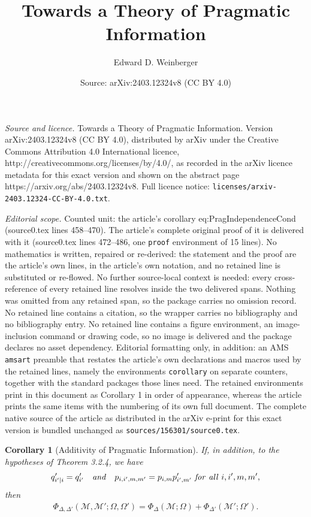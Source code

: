 \documentclass[10pt,a4paper]{amsart}
\title{Towards a Theory of Pragmatic Information}
\author{Edward D. Weinberger}
\date{Source: arXiv:2403.12324v8 (CC BY 4.0)}
\newtheorem{corollary}{Corollary}
\begin{document}
\maketitle

\noindent\emph{Source and licence.} Towards a Theory of Pragmatic Information. Version arXiv:2403.12324v8 (CC BY 4.0), distributed by arXiv under the Creative Commons Attribution 4.0 International licence, http://creativecommons.org/licenses/by/4.0/, as recorded in the arXiv licence metadata for this exact version and shown on the abstract page https://arxiv.org/abs/2403.12324v8. Full licence notice: \texttt{licenses/arxiv-2403.12324-CC-BY-4.0.txt}.\par\smallskip

\noindent\textit{Editorial scope.} Counted unit: the article's corollary eq:PragIndependenceCond (source0.tex lines 458--470). The article's complete original proof of it is delivered with it (source0.tex lines 472--486, one \texttt{proof} environment of 15 lines). No mathematics is written, repaired or re-derived: the statement and the proof are the article's own lines, in the article's own notation, and no retained line is substituted or re-flowed.  No further source-local context is needed: every cross-reference of every retained line resolves inside the two delivered spans.  Nothing was omitted from any retained span, so the package carries no omission record.  No retained line contains a citation, so the wrapper carries no bibliography and no bibliography entry.  No retained line contains a figure environment, an image-inclusion command or drawing code, so no image is delivered and the package declares no asset dependency.  Editorial formatting only, in addition: an AMS \texttt{amsart} preamble that restates the article's own declarations and macros used by the retained lines, namely the environments \texttt{corollary} on separate counters, together with the standard packages those lines need.  The retained environments print in this document as Corollary 1 in order of appearance, whereas the article prints the same items with the numbering of its own full document.  The complete native source of the article as distributed in the arXiv e-print for this exact version is bundled unchanged as \texttt{sources/156301/source0.tex}.
\begin{corollary}[Additivity of Pragmatic Information]
If, in addition, to the hypotheses of  Theorem 3.2.4, we have
\begin{align}
q'_{i'|i} = q'_{i'} {\it \quad and \quad} p_{i, i', m, m'} = p_{i, m} p'_{i', m'}  {\it \ for \ all \ } i, i', m, m', 
\label{eq:PragIndependenceCond}
\end{align}
then 
\begin{align}
 \Phi_{\Delta, \Delta'} (\mathcal M, \mathcal M'; \Omega, \Omega')=\Phi_{\Delta} ({\mathcal M}; \Omega)  +
\Phi_{\Delta'} ({\mathcal M'}; \Omega').   
\label{eq:PragIndependence}
\end{align}
\end{corollary}
\end{document}
